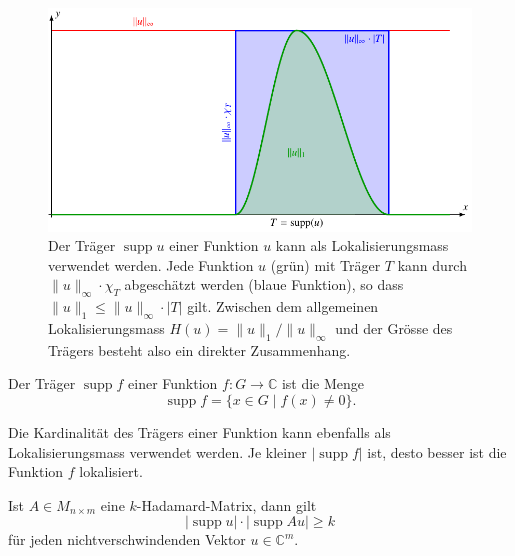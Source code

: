 \begin{figure}
\centering
\includegraphics{chapters/060-diskret/images/traeger.pdf}
\caption{Der Träger $\operatorname{supp}u$ einer Funktion $u$ kann
als Lokalisierungsmass verwendet werden.
Jede Funktion $u$ (grün) mit Träger $T$ kann durch $\|u\|_\infty\cdot\chi_T$
abgeschätzt werden (blaue Funktion), so dass $\|u\|_1\le \|u\|_\infty\cdot|T|$
gilt.
Zwischen dem allgemeinen Lokalisierungsmass $H(u)=\|u\|_1/\|u\|_\infty$
und der Grösse des Trägers besteht also ein direkter Zusammenhang.
\label{buch:diskret:unschaerfe:fig:traeger}}
\end{figure}

\begin{definition}
\label{buch:diskret:unschaerfe:def:support}
Der Träger $\operatorname{supp}f$ einer Funktion $f\colon G\to\mathbb{C}$ ist
%
die Menge
\[
\operatorname{supp} f
=
\{x\in G\mid f(x)\ne 0\}.
\]
\end{definition}

Die Kardinalität des Trägers einer Funktion kann ebenfalls als
Lokalisierungsmass verwendet werden.
Je kleiner $|\operatorname{supp}f|$ ist, desto besser ist die
Funktion $f$ lokalisiert.

\begin{satz}
\label{buch:diskret:unschaerfe:satz:supportsize}
Ist $A\in M_{n\times m}$ eine $k$-Hadamard-Matrix, dann gilt
\begin{equation}
|\operatorname{supp}u|
\cdot
|\operatorname{supp}Au|
\ge
k
\end{equation}
für jeden nichtverschwindenden Vektor $u\in\mathbb{C}^m$.
\end{satz}

